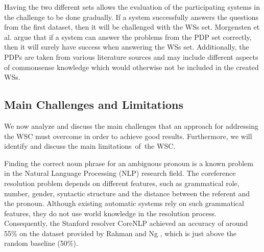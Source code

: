 Having the two different sets allows the evaluation of the participating systems in the challenge to be done gradually.
If a system successfully answers the questions from the first dataset, then it will be challenged with the WSs set. Morgensten et al. \cite{DBLP:journals/aim/MorgensternDO16} argue that if a system can answer the problems from the PDP set correctly, then it will surely have success when answering the WSs set.
Additionally, the PDPs are taken from various literature sources and may include different aspects of commonsense knowledge which would otherwise not be included in the created WSs.

\begin{comment}
Since the idea of the authors of the WSC was to construct this challenge as an alternative to the Turing test, it can be observed that indeed it captures the main characteristics of a Turing test:

\begin{itemize}
	\item it requires the subject to respond on a non-domain specific set of English sentences
	\item it is easy to solve by native English speakers
	\item to pass successfully the test, the subject has to think
\end{itemize}
\end{comment}


\subsection{Main Challenges and Limitations}
We now analyze and discuss the main challenges that an approach for addressing the WSC must overcome in order to achieve good results. Furthermore, we will identify and discuss the main limitations~of~the WSC.

Finding the correct noun phrase for an ambiguous pronoun is a known problem in the Natural Language Processing (NLP) research field. The coreference resolution problem depends on different features, such as grammatical role, number, gender, syntactic structure and the distance between the referent and the pronoun. Although existing automatic systems rely on such grammatical features, they do not use world knowledge in the resolution process. Consequently, the Stanford resolver CoreNLP \cite{lee11conllst} achieved an accuracy of around 55\% on the dataset provided by Rahman and Ng \cite{DBLP:conf/emnlp/RahmanN12}, which is just above the random baseline (50\%).

